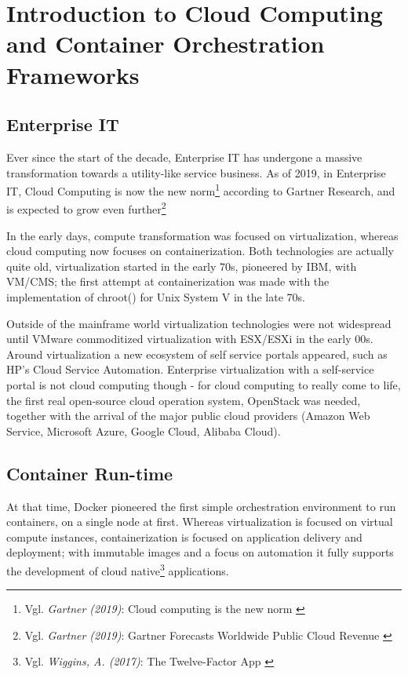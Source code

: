 %
%

\pagebreak
\section{Introduction to Cloud Computing and Container Orchestration Frameworks}

\onehalfspacing

\subsection{Enterprise IT}

Ever since the start of the decade, Enterprise IT has undergone a massive transformation towards a utility-like service business. As of 2019, in Enterprise IT, Cloud Computing is now the new norm\footnote{Vgl. \textit{Gartner (2019)}: Cloud computing is the new norm \cite{gartnerCloudStatement}} according to Gartner Research, and is expected to grow even further\footnote{Vgl. \textit{Gartner (2019)}: Gartner Forecasts Worldwide Public Cloud Revenue \cite{gartnerForecast}}

In the early days, compute transformation was focused on virtualization, whereas cloud computing now focuses on containerization. Both technologies are actually quite old, virtualization started in the early 70s, pioneered by IBM, with VM/CMS; the first attempt at containerization was made with the implementation of chroot() for Unix System V in the late 70s.

Outside of the mainframe world virtualization technologies were not widespread until VMware commoditized virtualization with ESX/ESXi in the early 00s. Around virtualization a new ecosystem of self service portals appeared, such as HP's Cloud Service Automation. Enterprise virtualization with a self-service portal is not cloud computing though - for cloud computing to really come to life, the first real open-source cloud operation system, OpenStack was needed, together with the arrival of the major public cloud providers (Amazon Web Service, Microsoft Azure, Google Cloud, Alibaba Cloud).

\subsection{Container Run-time}

At that time, Docker pioneered the first simple orchestration environment to run containers, on a single node at first. Whereas virtualization is focused on virtual compute instances, containerization is focused on application delivery and deployment; with immutable images and a focus on automation it fully supports the development of cloud native\footnote{Vgl. \textit{Wiggins, A. (2017)}: The Twelve-Factor App \cite{12factor}} applications.

